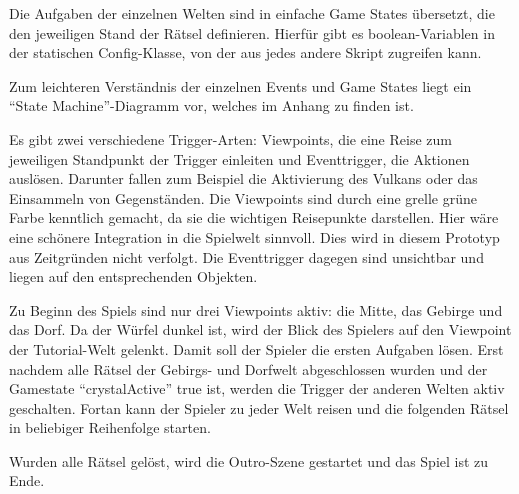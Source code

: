 
Die Aufgaben der einzelnen Welten sind in einfache Game States übersetzt, die den jeweiligen Stand der Rätsel definieren. Hierfür gibt es boolean-Variablen in der statischen Config-Klasse, von der aus jedes andere Skript zugreifen kann.

Zum leichteren Verständnis der einzelnen Events und Game States liegt ein \enquote{State Machine}-Diagramm vor, welches im Anhang zu finden ist.

Es gibt zwei verschiedene Trigger-Arten: Viewpoints, die eine Reise zum jeweiligen Standpunkt der Trigger einleiten und Eventtrigger, die Aktionen auslösen. Darunter fallen zum Beispiel die Aktivierung des Vulkans oder das Einsammeln von Gegenständen.
Die Viewpoints sind durch eine grelle grüne Farbe kenntlich gemacht, da sie die wichtigen Reisepunkte darstellen. Hier wäre eine schönere Integration in die Spielwelt sinnvoll. Dies wird in diesem Prototyp aus Zeitgründen nicht verfolgt. Die Eventtrigger dagegen sind unsichtbar und liegen auf den entsprechenden Objekten.

Zu Beginn des Spiels sind nur drei Viewpoints aktiv: die Mitte, das Gebirge und das Dorf. Da der Würfel dunkel ist, wird der Blick des Spielers auf den Viewpoint der Tutorial-Welt gelenkt. Damit soll der Spieler die ersten Aufgaben lösen. Erst nachdem alle Rätsel der Gebirgs- und Dorfwelt abgeschlossen wurden und der Gamestate \enquote{crystalActive} true ist, werden die Trigger der anderen Welten aktiv geschalten. Fortan kann der Spieler zu jeder Welt reisen und die folgenden Rätsel in beliebiger Reihenfolge starten.

Wurden alle Rätsel gelöst, wird die Outro-Szene gestartet und das Spiel ist zu Ende.
